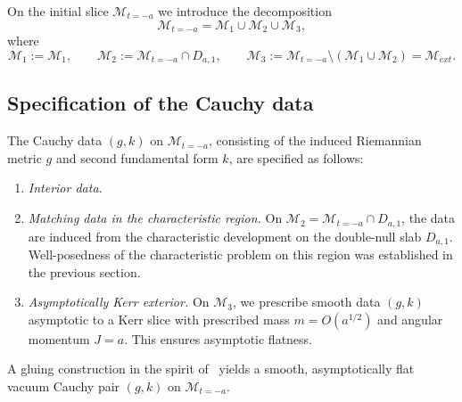 \documentclass{amsart}
\begin{document}
{\noindent On the initial slice $\mathcal{M}_{t=-a}$ we introduce the decomposition
\begin{equation}\label{eq:region-decomposition}
\mathcal{M}_{t=-a}
= \mathcal{M}_1 \cup \mathcal{M}_2 \cup \mathcal{M}_3,
\end{equation}
where
\[
\mathcal{M}_{1}:=\mathcal{M}_{1},\qquad
\mathcal{M}_{2}:=\mathcal{M}_{t=-a}\cap D_{a,1},\qquad
\mathcal{M}_{3}:=\mathcal{M}_{t=-a}\setminus(\mathcal{M}_{1}\cup \mathcal{M}_{2})=\mathcal{M}_{ext}.
\]

\subsection{Specification of the Cauchy data}

The Cauchy data $(g,k)$ on $\mathcal{M}_{t=-a}$, consisting of the induced Riemannian metric $g$ and second fundamental form $k$, are specified as follows:

\begin{enumerate}[label=\textbf{(\alph*)}]
\item \emph{Interior data.}  


\item \emph{Matching data in the characteristic region.}  
On $\mathcal{M}_2=\mathcal{M}_{t=-a}\cap D_{a,1}$, the data are induced from the characteristic development on the double-null slab $D_{a,1}$.  
Well-posedness of the characteristic problem on this region was established in the previous section.

\item \emph{Asymptotically Kerr exterior.}  
On $\mathcal{M}_3$, we prescribe smooth data $(g,k)$ asymptotic to a Kerr slice with prescribed mass $m=O(a^{1/2})$ and angular momentum $J=a$.  
This ensures asymptotic flatness.
\end{enumerate}

\noindent A gluing construction in the spirit of~\cite{CS, Li,AL} yields a smooth, asymptotically flat vacuum Cauchy pair $(g,k)$ on $\mathcal{M}_{t=-a}$.



}
\end{document}
